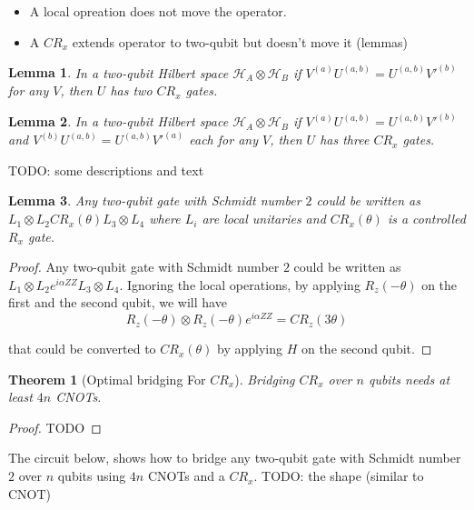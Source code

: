\documentclass{report}
\newtheorem{theorem}{Theorem}
\newtheorem{lemma}{Lemma}
\begin{document}
\begin{itemize}
  \item A local opreation does not move the operator.
  \item A $CR_x$ extends operator to two-qubit but doesn't move it (lemmas)
\end{itemize}

\begin{lemma}
  In a two-qubit Hilbert space $\mathcal{H}_A \otimes \mathcal{H}_B$ if $V^{(a)} U^{(a,b)} = U^{(a,b)} V'^{(b)}$ for any $V$, then $U$ has two $CR_x$ gates.
\end{lemma}

\begin{lemma}
  In a two-qubit Hilbert space $\mathcal{H}_A \otimes \mathcal{H}_B$ if $V^{(a)} U^{(a,b)} = U^{(a,b)} V'^{(b)}$ and $V^{(b)} U^{(a,b)} = U^{(a,b)} V'^{(a)}$ each for any $V$, then $U$ has three $CR_x$ gates.
\end{lemma}



TODO: some descriptions and text 

\begin{lemma}
  Any two-qubit gate with Schmidt number $2$ could be written as $L_1 \otimes L_2 CR_x(\theta) L_3 \otimes L_4$ where $L_i$ are local unitaries and $CR_x(\theta)$ is a controlled $R_x$ gate.
  \label{lem:decomposition-schmidt-2}
\end{lemma}
\begin{proof}
  Any two-qubit gate with Schmidt number $2$ could be written as $L_1 \otimes L_2 e^{i\alpha ZZ} L_3 \otimes L_4$. 
  Ignoring the local operations, by applying $R_z(-\theta)$ on the first and the second qubit, we will have 
  \begin{equation}
    R_z(-\theta) \otimes R_z(-\theta) e^{i\alpha ZZ} = CR_z(3\theta)
  \end{equation}
  
  that could be converted to $CR_x(\theta)$ by applying $H$ on the second qubit.
\end{proof}

\begin{theorem}[Optimal bridging For $CR_x$]
  Bridging $CR_x$ over $n$ qubits needs at least $4n$ CNOTs.
  \label{thm:bridging-crx}
\end{theorem}
\begin{proof}
  TODO
\end{proof}

The circuit below, shows how to bridge any two-qubit gate with Schmidt number $2$ over $n$ qubits using $4n$ CNOTs and a $CR_x$.
TODO: the shape (similar to CNOT)
\end{document}
